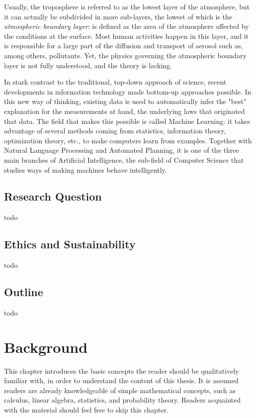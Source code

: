 \documentclass[12pt]{book}
\begin{document}
Usually, the troposphere is referred to as the lowest layer of the atmosphere, but it can actually be subdivided in more sub-layers, the lowest of which is the \emph{atmospheric boundary layer}: is defined as the area of the atmosphere affected by the conditions at the surface. Most human activities happen in this layer, and it is responsible for a large part of the diffusion and transport of aerosol such as, among others, pollutants. Yet, the physics governing the atmospheric boundary layer is not fully understood, and the theory is lacking.

In stark contrast to the traditional, top-down approach of science, recent developments in information technology made bottom-up approaches possible. In this new way of thinking, existing data is used to automatically infer the "best" explanation for the measurements at hand, the underlying laws that originated that data. The field that makes this possible is called Machine Learning: it takes advantage of several methods coming from statistics, information theory, optimization theory, etc., to make computers learn from examples. Together with Natural Language Processing and Automated Planning, it is one of the three main branches of Artificial Intelligence, the sub-field of Computer Science that studies ways of making machines behave intelligently.

\section{Research Question}
todo

\section{Ethics and Sustainability}
todo

\section{Outline}
todo

\chapter{Background}
This chapter introduces the basic concepts the reader should be qualitatively familiar with, in order to understand the content of this thesis. It is assumed readers are already knowledgeable of simple mathematical concepts, such as calculus, linear algebra, statistics, and probability theory. Readers acquainted with the material should feel free to skip this chapter.
\end{document}
